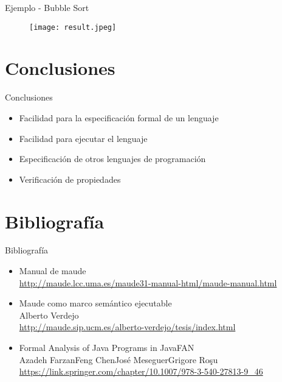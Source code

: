 \documentclass{beamer}
\begin{document}
    \begin{frame}[fragile]{Ejemplo - Bubble Sort}
        \begin{figure}
            \texttt{[image: result.jpeg]}
        \end{figure}
    \end{frame}


    \section{Conclusiones}
    \begin{frame}{Conclusiones}
        \begin{itemize}
            \item Facilidad para la especificación formal de un lenguaje
            \item Facilidad para ejecutar el lenguaje
            \item Especificación de otros lenguajes de programación
            \item Verificación de propiedades
        \end{itemize}
    \end{frame}

    \section{Bibliografía}
    \begin{frame}{Bibliografía}
        \begin{itemize}
            \item Manual de maude \\
                    \url{http://maude.lcc.uma.es/maude31-manual-html/maude-manual.html}
            \item Maude como marco semántico ejecutable \\
            Alberto Verdejo \\
                    \url{http://maude.sip.ucm.es/alberto-verdejo/tesis/index.html}
            \item Formal Analysis of Java Programs in JavaFAN \\
            Azadeh FarzanFeng ChenJosé MeseguerGrigore Roşu \\
                \url{https://link.springer.com/chapter/10.1007/978-3-540-27813-9_46}
        \end{itemize}
    \end{frame}
\end{document}
